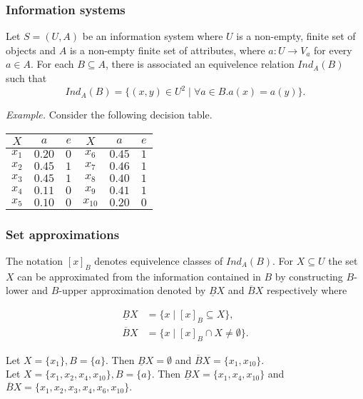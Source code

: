 \documentclass[envcountsect]{beamer}
\begin{document}
\begin{frame}
	\frametitle{Information systems}

	Let $S=(U,A)$ be an information system where $U$ is a non-empty, finite set of objects and $A$ is a non-empty
	finite set of attributes, where $a: U \rightarrow V_a$ for every $a \in A$. For each $B \subseteq A$, there is associated an equivelence relation $Ind_A(B)$ such that
$$	
		Ind_A(B)= \{(x,y)\in U^2 \; | \; \forall a \in B. a(x) = a(y)\}.
$$

	\emph{Example.} Consider the following decision table.

\begin{table}
	\begin{tabular}{cccccc}
		\hline 
		$X$& $a$& $e$& $X$& $a$& $e$\\
		\hline
		$x_1$ & $0.20$ & $0$&  $x_6$ & $0.45$ & $1$ \\
		$x_2$ & $0.45$ & $1$ & $x_7$ & $0.46$ & $1$ \\
		$x_3$ & $0.45$ & $1$ & $x_8$ & $0.40$ & $1$  \\
		$x_4$ & $0.11$ & $0$ & $x_9$ & $0.41$ & $1$ \\
		$x_5$ & $0.10$ & $0$ & $x_{10}$ & $0.20$ & $0$\\
		\hline
	\end{tabular}
\end{table}

\end{frame}

\begin{frame}
	\frametitle{Set approximations}
	The notation $[x]_B$ denotes equivelence classes of $Ind_A(B)$. For $X \subseteq U$ the set $X$ can be approximated from the information contained in $B$ by constructing $B$-lower and $B$-upper approximation denoted by $\underline{B}X$ and $\overline{B}X$ respectively where 

	\begin{equation*}
		\begin{split}
			\underline{B}X &= \{x \; | \; [x]_B \subseteq X \},	\\
			\overline{B}X &= \{x \; | \; [x]_B \cap X \neq \emptyset \}.
		\end{split}
	\end{equation*}
	\begin{example}
	Let $X= \{x_1\}, B=\{a\}.$ Then $\underline{B}X = \emptyset$ and $\overline{B}X = \{x_1,x_{10}\}$.\\
		Let $X=\{x_1,x_2,x_4,x_{10}\}, B=\{a\}.$ Then $\underline{B}X = \{x_1,x_4,x_{10}\}$ and $\overline{B}X = \{x_1,x_2,x_3,x_4,x_6,x_{10}\}. $ 
	\end{example}
\end{frame}
\end{document}
